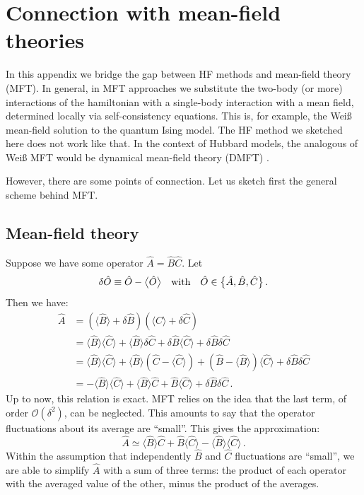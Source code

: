 \chapter{Connection with mean-field theories}\label{app:hf-mft}

In this appendix we bridge the gap between HF methods and mean-field theory (MFT). In general, in MFT approaches we substitute the two-body (or more) interactions of the hamiltonian with a single-body interaction with a mean field, determined locally via self-consistency equations. This is, for example, the Weiß mean-field solution to the quantum Ising model. The HF method we sketched here does not work like that. In the context of Hubbard models, the analogous of Weiß MFT would be dynamical mean-field theory (DMFT) \cite{georges1996dynamical}.

However, there are some points of connection. Let us sketch first the general scheme behind MFT. 

\section{Mean-field theory}

Suppose we have some operator $\hat A = \hat B \hat C$. Let
\[
\delta \hat O \equiv \hat O - \big\langle \hat O \big\rangle
\qq{with}
\hat O \in \big\lbrace \hat A, \hat B, \hat C \big\rbrace \, .
\]
Then we have:
\[
\begin{aligned}
	\hat A &= \left( \big\langle \hat B \big\rangle + \delta \hat B \right) \left( \big\langle \hat C \big\rangle + \delta \hat C \right) \\
	&= \big\langle \hat B \big\rangle \big\langle \hat C \big\rangle + \big\langle \hat B \big\rangle \delta \hat C + \delta \hat B \big\langle \hat C \big\rangle + \delta \hat B \delta \hat C \\
	&= \big\langle \hat B \big\rangle \big\langle \hat C \big\rangle + \big\langle \hat B \big\rangle \left( \hat C - \big\langle \hat C \big\rangle \right) + \left( \hat B - \big\langle \hat B \big\rangle \right) \big\langle \hat C \big\rangle + \delta \hat B \delta \hat C \\
	&= - \big\langle \hat B \big\rangle \big\langle \hat C \big\rangle + \big\langle \hat B \big\rangle \hat C + \hat B \big\langle \hat C \big\rangle + \delta \hat B \delta \hat C \, .
\end{aligned}
\]
Up to now, this relation is exact. MFT relies on the idea that the last term, of order $\mathcal{O}(\delta^2)$, can be neglected. This amounts to say that the operator fluctuations about its average are ``small''. This gives the approximation:
\begin{equation}\label{appeq:mft-A=BC}
	\hat A \simeq \big\langle \hat B \big\rangle \hat C + \hat B \big\langle \hat C \big\rangle - \big\langle \hat B \big\rangle \big\langle \hat C \big\rangle \, .
\end{equation}
Within the assumption that independently $\hat B$ and $\hat C$ fluctuations are ``small'', we are able to simplify $\hat A$ with a sum of three terms: the product of each operator with the averaged value of the other, minus the product of the averages.

